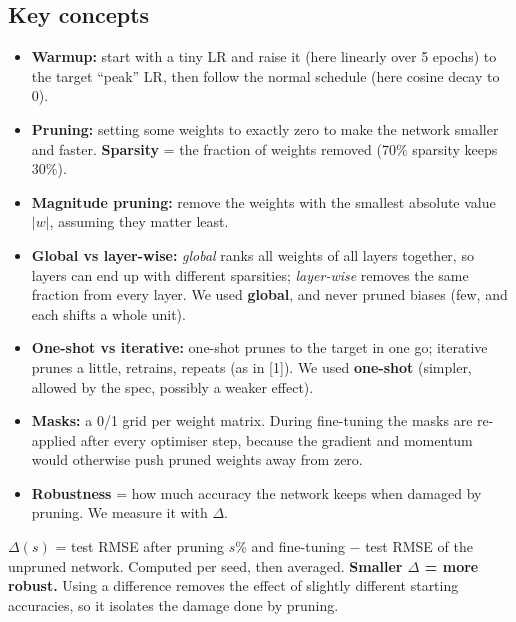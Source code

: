 \documentclass[11pt,a4paper]{article}
\begin{document}
\subsection{Key concepts}
\begin{itemize}
  \item \textbf{Warmup:} start with a tiny LR and raise it (here linearly over 5 epochs) to the target ``peak'' LR, then
        follow the normal schedule (here cosine decay to 0).
  \item \textbf{Pruning:} setting some weights to exactly zero to make the network smaller and faster.
        \textbf{Sparsity} = the fraction of weights removed (70\% sparsity keeps 30\%).
  \item \textbf{Magnitude pruning:} remove the weights with the smallest absolute value $|w|$, assuming they matter least.
  \item \textbf{Global vs layer-wise:} \emph{global} ranks all weights of all layers together, so layers can end up with
        different sparsities; \emph{layer-wise} removes the same fraction from every layer. We used \textbf{global}, and
        never pruned biases (few, and each shifts a whole unit).
  \item \textbf{One-shot vs iterative:} one-shot prunes to the target in one go; iterative prunes a little, retrains,
        repeats (as in [1]). We used \textbf{one-shot} (simpler, allowed by the spec, possibly a weaker effect).
  \item \textbf{Masks:} a 0/1 grid per weight matrix. During fine-tuning the masks are re-applied after every optimiser
        step, because the gradient and momentum would otherwise push pruned weights away from zero.
  \item \textbf{Robustness} = how much accuracy the network keeps when damaged by pruning. We measure it with $\Delta$.
\end{itemize}

\begin{keyidea}
$\Delta(s)$ = test RMSE after pruning $s$\% and fine-tuning $-$ test RMSE of the unpruned network. Computed per seed,
then averaged. \textbf{Smaller $\Delta$ = more robust.} Using a difference removes the effect of slightly different
starting accuracies, so it isolates the damage done by pruning.
\end{keyidea}
\end{document}
